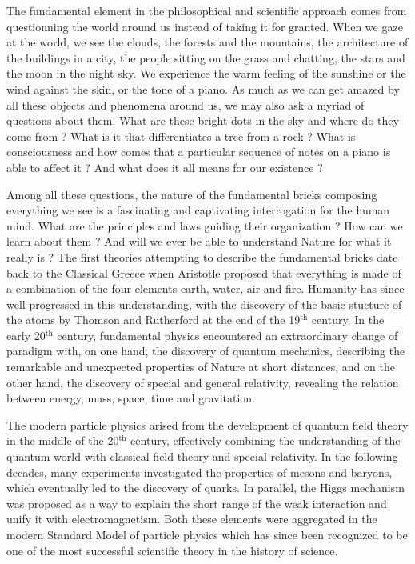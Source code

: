 \vspace*{0.5cm}

The fundamental element in the philosophical and scientific approach comes from questionning the world
around us instead of taking it for granted. When we gaze at the world, we see the clouds, the forests
and the mountains, the architecture of the buildings in a city, the people sitting on the grass and chatting,
the stars and the moon in the night sky. We experience the warm feeling of the sunshine or
the wind against the skin, or the tone of a piano. As much as we can get amazed by all these
objects and phenomena around us, we may also ask a myriad of questions about them. What
are these bright dots in the sky and where do they come from ? What is it that differentiates
a tree from a rock ? What is consciousness and how comes that a particular sequence of
notes on a piano is able to affect it ? And what does it all means for our existence ?

Among all these questions, the nature of the fundamental bricks composing everything we
see is a fascinating and captivating interrogation for the human mind. What are the principles
and laws guiding their organization ? How can we learn about them ? And will we ever be
able to understand Nature for what it really is ? The first theories attempting to describe
the fundamental bricks date back to the Classical Greece when Aristotle proposed that
everything is made of a combination of the four elements earth, water, air and fire.
Humanity has since well progressed in this understanding, with the discovery of the basic
stucture of the atoms by Thomson and Rutherford at the end of the 19$^\text{th}$ century.
In the early 20$^\text{th}$ century, fundamental physics encountered an extraordinary
change of paradigm with, on one hand, the discovery of quantum mechanics, describing the
remarkable and unexpected properties of Nature at short distances, and on the other hand,
the discovery of special and general relativity, revealing the relation between energy,
mass, space, time and gravitation.

The modern particle physics arised from the development of quantum field theory in the
middle of the 20$^\text{th}$ century, effectively combining the understanding of the
quantum world with classical field theory and special relativity. In the following decades,
many experiments investigated the properties of mesons and baryons, which eventually led
to the discovery of quarks. In parallel, the Higgs mechanism was proposed as a way to explain
the short range of the weak interaction and unify it with electromagnetism. Both these
elements were aggregated in the modern Standard Model of particle physics which has since
been recognized to be one of the most successful scientific theory in the history of science.

